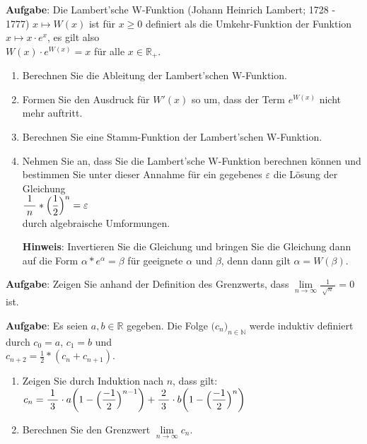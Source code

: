 \documentclass{article}
\newcommand{\bruch}[2]{\displaystyle\frac{\;\displaystyle#1\;}{\;\displaystyle#2\;}}
\newcommand{\folge}[1]{\bigl(#1\bigr)_{n\in\mathbb{N}}}
\begin{document}
\pagebreak
\noindent
\textbf{Aufgabe}:  Die Lambert'sche W-Funktion (Johann Heinrich Lambert; 1728 - 1777)
$x \mapsto W(x)$ ist f\"ur $x\geq 0$ definiert als die Umkehr-Funktion der Funktion $x \mapsto x\cdot e^x$,
es gilt also 
\\[0.1cm]
\hspace*{1.3cm} $\displaystyle W(x) \cdot e^{W(x)} = x$ \quad f\"ur alle $x \in \mathbb{R}_+$.
\begin{enumerate}
\item Berechnen Sie die Ableitung der Lambert'schen W-Funktion.
\item Formen Sie den Ausdruck f\"ur $W'(x)$ so um, dass der Term $e^{W(x)}$ nicht mehr
      auftritt.
\item Berechnen Sie eine Stamm-Funktion der Lambert'schen W-Funktion.
\item Nehmen Sie an, dass Sie die Lambert'sche W-Funktion berechnen k\"onnen und
      bestimmen Sie unter dieser Annahme f\"ur ein gegebenes $\varepsilon$ die L\"osung der Gleichung 
      \\[0.1cm]
      \hspace*{1.3cm}
      $\bruch{1}{n} * \Bigl(\frac{1}{2}\Bigr)^n = \varepsilon$
      \\[0.1cm]
      durch algebraische Umformungen.

      \noindent
      \textbf{Hinweis}: Invertieren Sie die Gleichung und bringen Sie die Gleichung dann
      auf die Form $\alpha * e^\alpha = \beta$ f\"ur geeignete $\alpha$ und $\beta$, denn
      dann gilt $\alpha = W(\beta)$.
\end{enumerate}
\vspace*{0.3cm}


\noindent
 \textbf{Aufgabe}: Zeigen Sie anhand der Definition des Grenzwerts, dass 
      $\lim\limits_{n \rightarrow \infty} \bruch{1}{\sqrt{n}} = 0$ ist.
\vspace*{0.3cm}

\noindent
\textbf{Aufgabe}:
Es seien $a,b\in\mathbb{R}$ gegeben. 
Die Folge $\folge{c_n}$ werde induktiv definiert durch $c_0 = a$, $c_1 = b$ und  
\\[0.1cm]
\hspace*{1.3cm} $c_{n+2} = \frac{1}{2}*(c_n + c_{n+1})$.
\begin{enumerate}
\item Zeigen Sie durch Induktion nach $n$, dass gilt: 
      \\[0.1cm]
      \hspace*{1.3cm}
      $c_n = \bruch{1}{3}\cdot a \biggl(1-\Bigl(\frac{-1}{2}\Bigr)^{n-1}\biggr) + \bruch{2}{3}\cdot b \biggl(1-\Bigl(\frac{-1}{2}\Bigr)^{n}\biggr)$
\item Berechnen Sie den Grenzwert $\lim\limits_{n \rightarrow \infty} c_n$.
\end{enumerate}
\end{document}
